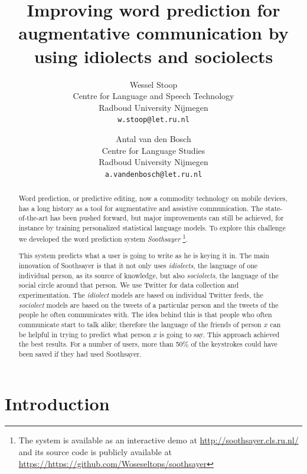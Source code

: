 \documentclass[12pt]{article}
\title{Improving word prediction for augmentative communication by using idiolects and sociolects}
\author{
Wessel Stoop\vspace{-2ex}\\
Centre for Language and Speech Technology\vspace{-2ex}\\
Radboud University Nijmegen\vspace{-2ex} \\
  {\tt w.stoop@let.ru.nl} \\
  \and
  Antal van den Bosch \vspace{-2ex}\\
Centre for Language Studies \vspace{-2ex}\\
Radboud University Nijmegen \vspace{-2ex}\\
  {\tt a.vandenbosch@let.ru.nl} \vspace{-2ex}\\
}
\date{}
\begin{document}
\maketitle

\begin{abstract}
Word prediction, or predictive editing, now a commodity technology on mobile devices, has a long history as a tool for augmentative and assistive communication. The state-of-the-art has been pushed forward, but major improvements can still be achieved, for instance by training personalized statistical language models.
To explore this challenge we developed the word prediction system \emph{Soothsayer}
\footnote{The system is available as an interactive demo at \url{http://soothsayer.cls.ru.nl/} and its source code is publicly available at \url{https://https://github.com/Woseseltops/soothsayer}}. 

This system predicts what a user is going to write as he is keying it in. The main innovation of Soothsayer is that it not only uses \emph{idiolects}, the language of one individual person, as its source of knowledge, but also \emph{sociolects}, the language of the social circle around that person. We use Twitter for data collection and experimentation. The \emph{idiolect}\/ models are based on individual Twitter feeds, the \emph{sociolect}\/ models are based on the tweets of a particular person and the tweets of the people he often communicates with. The idea behind this is that people who often communicate start to talk alike; therefore the language of the friends of person $x$ can be helpful in trying to predict what person $x$ is going to say. This approach achieved the best results. For a number of users, more than 50\% of the keystrokes could have been saved if they had used Soothsayer. 
\end{abstract}

\section{Introduction} \label{intro}
\end{document}
